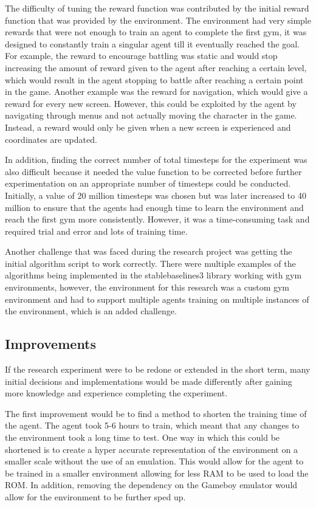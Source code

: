 The difficulty of tuning the reward function was contributed by the initial reward function that was provided by the environment. The environment had very simple rewards that were not enough to train an agent to complete the first gym, it was designed to constantly train a singular agent till it eventually reached the goal. For example, the reward to encourage battling was static and would stop increasing the amount of reward given to the agent after reaching a certain level, which would result in the agent stopping to battle after reaching a certain point in the game. Another example was the reward for navigation, which would give a reward for every new screen. However, this could be exploited by the agent by navigating through menus and not actually moving the character in the game. Instead, a reward would only be given when a new screen is experienced and coordinates are updated. 

In addition, finding the correct number of total timesteps for the experiment was also difficult because it needed the value function to be corrected before further experimentation on an appropriate number of timesteps could be conducted. Initially, a value of 20 million timesteps was chosen but was later increased to 40 million to ensure that the agents had enough time to learn the environment and reach the first gym more consistently. However, it was a time-consuming task and required trial and error and lots of training time.

Another challenge that was faced during the research project was getting the initial algorithm script to work correctly. There were multiple examples of the algorithms being implemented in the stablebaselines3 library working with gym environments, however, the environment for this research was a custom gym environment and had to support multiple agents training on multiple instances of the environment, which is an added challenge. 

\subsection{Improvements}

If the research experiment were to be redone or extended in the short term, many initial decisions and implementations would be made differently after gaining more knowledge and experience completing the experiment. 

The first improvement would be to find a method to shorten the training time of the agent. The agent took 5-6 hours to train, which meant that any changes to the environment took a long time to test. One way in which this could be shortened is to create a hyper accurate representation of the environment on a smaller scale without the use of an emulation. This would allow for the agent to be trained in a smaller environment allowing for less RAM to be used to load the ROM. In addition, removing the dependency on the Gameboy emulator would allow for the environment to be further sped up. 

